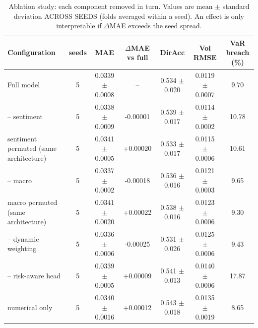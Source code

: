 \begin{table}
\caption{Ablation study: each component removed in turn. Values are mean $\pm$ standard deviation ACROSS SEEDS (folds averaged within a seed). An effect is only interpretable if $\Delta$MAE exceeds the seed spread.}
\label{tab:ablation}
\begin{tabular}{lcccccc}
\toprule
Configuration & seeds & MAE & $\Delta$MAE vs full & DirAcc & Vol RMSE & VaR breach (\%) \\
\midrule
Full model & 5 & 0.0339 $\pm$ 0.0008 & -- & 0.534 $\pm$ 0.020 & 0.0119 $\pm$ 0.0007 & 9.70 \\
-- sentiment & 5 & 0.0338 $\pm$ 0.0009 & -0.00001 & 0.539 $\pm$ 0.017 & 0.0114 $\pm$ 0.0002 & 10.78 \\
sentiment permuted (same architecture) & 5 & 0.0341 $\pm$ 0.0005 & +0.00020 & 0.533 $\pm$ 0.017 & 0.0115 $\pm$ 0.0006 & 10.61 \\
-- macro & 5 & 0.0337 $\pm$ 0.0002 & -0.00018 & 0.536 $\pm$ 0.016 & 0.0121 $\pm$ 0.0003 & 9.65 \\
macro permuted (same architecture) & 5 & 0.0341 $\pm$ 0.0020 & +0.00022 & 0.538 $\pm$ 0.016 & 0.0123 $\pm$ 0.0006 & 9.30 \\
-- dynamic weighting & 5 & 0.0336 $\pm$ 0.0006 & -0.00025 & 0.531 $\pm$ 0.026 & 0.0125 $\pm$ 0.0006 & 9.43 \\
-- risk-aware head & 5 & 0.0339 $\pm$ 0.0005 & +0.00009 & 0.541 $\pm$ 0.013 & 0.0140 $\pm$ 0.0006 & 17.87 \\
numerical only & 5 & 0.0340 $\pm$ 0.0016 & +0.00012 & 0.543 $\pm$ 0.018 & 0.0135 $\pm$ 0.0019 & 8.65 \\
\bottomrule
\end{tabular}
\end{table}
